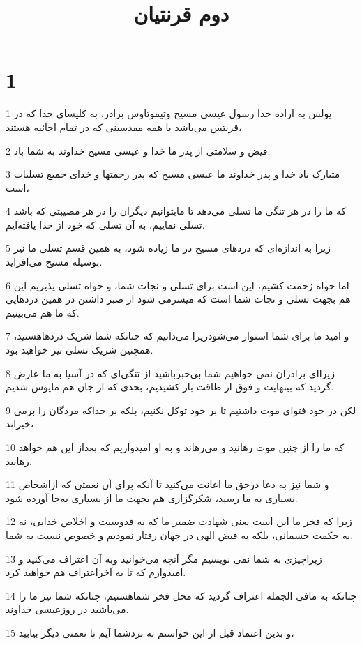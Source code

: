 

\title{دوم قرنتيان}


\chapter{1}

\par 1 پولس به اراده خدا رسول عیسی مسیح وتیموتاوس برادر، به کلیسای خدا که در قرنتس می‌باشد با همه مقدسینی که در تمام اخائیه هستند،
\par 2 فیض و سلامتی از پدر ما خدا و عیسی مسیح خداوند به شما باد.
\par 3 متبارک باد خدا و پدر خداوند ما عیسی مسیح که پدر رحمتها و خدای جمیع تسلیات است،
\par 4 که ما را در هر تنگی ما تسلی می‌دهد تا مابتوانیم دیگران را در هر مصیبتی که باشد تسلی نماییم، به آن تسلی که خود از خدا یافته‌ایم.
\par 5 زیرا به اندازه‌ای که دردهای مسیح در ما زیاده شود، به همین قسم تسلی ما نیز بوسیله مسیح می‌افزاید.
\par 6 اما خواه زحمت کشیم، این است برای تسلی و نجات شما، و خواه تسلی پذیریم این هم بجهت تسلی و نجات شما است که میسرمی شود از صبر داشتن در همین دردهایی که ما هم می‌بینیم.
\par 7 و امید ما برای شما استوار می‌شودزیرا می‌دانیم که چنانکه شما شریک دردهاهستید، همچنین شریک تسلی نیز خواهید بود.
\par 8 زیرا‌ای برادران نمی خواهیم شما بی‌خبرباشید از تنگی‌ای که در آسیا به ما عارض گردید که بینهایت و فوق از طاقت بار کشیدیم، بحدی که از جان هم مایوس شدیم.
\par 9 لکن در خود فتوای موت داشتیم تا بر خود توکل نکنیم، بلکه بر خداکه مردگان را برمی خیزاند،
\par 10 که ما را از چنین موت رهانید و می‌رهاند و به او امیدواریم که بعداز این هم خواهد رهانید.
\par 11 و شما نیز به دعا درحق ما اعانت می‌کنید تا آنکه برای آن نعمتی که ازاشخاص بسیاری به ما رسید، شکرگزاری هم بجهت ما از بسیاری به‌جا آورده شود.
\par 12 زیرا که فخر ما این است یعنی شهادت ضمیر ما که به قدوسیت و اخلاص خدایی، نه به حکمت جسمانی، بلکه به فیض الهی در جهان رفتار نمودیم و خصوص نسبت به شما.
\par 13 زیراچیزی به شما نمی نویسیم مگر آنچه می‌خوانید وبه آن اعتراف می‌کنید و امیدوارم که تا به آخراعتراف هم خواهید کرد.
\par 14 چنانکه به مافی الجمله اعتراف گردید که محل فخر شماهستیم، چنانکه شما نیز ما را می‌باشید در روزعیسی خداوند.
\par 15 و بدین اعتماد قبل از این خواستم به نزدشما آیم تا نعمتی دیگر بیابید،
